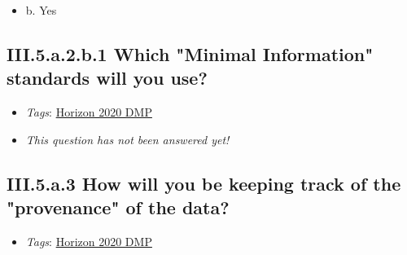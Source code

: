 \documentclass[a4paper,12pt]{report}
\begin{document}
\begin{itemize}
  \item[\CheckmarkBold] b. Yes
\end{itemize}




\subsection*{\protect\textcolor{colorSecId}{III.5.a.2.b.1} Which "Minimal Information" standards will you use?}

\label{b1df3c74-0b1f-4574-81c4-4cc2d780c1af.8c962e6f-17ee-4b22-8ebb-9f06f779e3b3.6d18bfff-0f53-469b-934e-9806dda9d4fb.6226d7f2-565f-4991-94b3-c00be6aca20e.08bd1365-7f0e-4b78-aeb1-3c0e85e84cb6.e7b6cd51-22a6-4f7a-9ad5-a7234fa436cb}


\begin{itemize}
  \item \textit{Tags}: \ul{Horizon 2020 DMP}
  \end{itemize}




\begin{itemize}
  \item[\XSolidBrush] \textit{This question has not been answered yet!}
\end{itemize}
  
\subsection*{\protect\textcolor{colorSecId}{III.5.a.3} How will you be keeping track of the "provenance" of the data?}

\label{b1df3c74-0b1f-4574-81c4-4cc2d780c1af.8c962e6f-17ee-4b22-8ebb-9f06f779e3b3.6d18bfff-0f53-469b-934e-9806dda9d4fb.948b5fd8-c1bd-457d-8f81-ea2fd093f541}


\begin{itemize}
  \item \textit{Tags}: \ul{Horizon 2020 DMP}
  \end{itemize}
\end{document}
